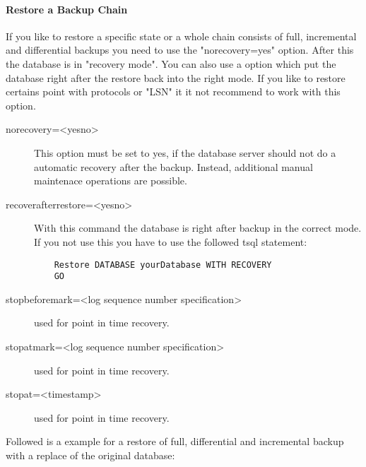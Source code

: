 \paragraph{Restore a Backup Chain}

If you like to restore a specific state or a whole chain consists of full, incremental and differential backups you need to use the "norecovery=yes" option. After this the database is in "recovery mode". You can also use a option which put the database right after the restore back into the right mode. If you like to restore certains point with protocols or
"LSN" it it not recommend to work with this option.

\begin{description}
  \item[norecovery=\textless yes{\textbar}no\textgreater]
  This option must be set to yes, if the database server should not do a automatic recovery after the backup. Instead, additional manual maintenace operations are possible.
  \item[recoverafterrestore=\textless yes{\textbar}no\textgreater]
  With this command the database is right after backup in the correct mode. If you not use this you have to use the followed tsql statement:
  \footnotesize
  \begin{verbatim}
    Restore DATABASE yourDatabase WITH RECOVERY
    GO
  \end{verbatim}
  \normalsize
  \item[stopbeforemark=\textless log sequence number specification\textgreater]
  used for point in time recovery.
  \item[stopatmark=\textless log sequence number specification\textgreater]
  used for point in time recovery.
  \item[stopat=\textless timestamp\textgreater]
  used for point in time recovery.
\end{description}

Followed is a example for a restore of full, differential and incremental backup with a replace of the original database:

